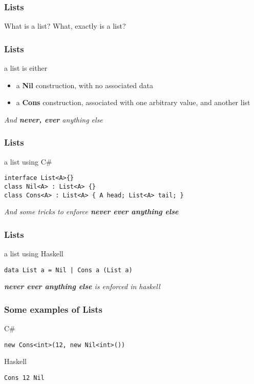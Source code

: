 \begin{frame}
\frametitle{Lists}
\begin{block}{What is a list?}
What, exactly is a list?
\end{block}
\end{frame}

\begin{frame}
\frametitle{Lists}
\begin{block}{a list is either}
\begin{itemize}
\item a \textbf{Nil} construction, with no associated data
\item a \textbf{Cons} construction, associated with one arbitrary value, and another list
\end{itemize}
\end{block}
\emph{And \textbf{never, ever} anything else}
\end{frame}

\begin{frame}[fragile]
\frametitle{Lists}
\begin{block}{a list using C\#}
\begin{lstlisting}[style=csharp,basicstyle=\scriptsize\ttfamily,mathescape]
interface List<A>{}
class Nil<A> : List<A> {}
class Cons<A> : List<A> { A head; List<A> tail; }
\end{lstlisting}
\end{block}
\tiny{\emph{And some tricks to enforce \textbf{never ever anything else}}}
\end{frame}

\begin{frame}[fragile]
\frametitle{Lists}
\begin{block}{a list using Haskell}
\begin{lstlisting}[style=haskell,basicstyle=\scriptsize\ttfamily,mathescape]
data List a = Nil | Cons a (List a)
\end{lstlisting}
\end{block}
\tiny{\emph{\textbf{never ever anything else} is enforced in haskell}}
\end{frame}

\begin{frame}[fragile]
\frametitle{Some examples of Lists}
\begin{block}{C\#}
\begin{lstlisting}[style=csharp,basicstyle=\scriptsize\ttfamily,mathescape]
new Cons<int>(12, new Nil<int>())
\end{lstlisting}
\end{block}
\begin{block}{Haskell}
\begin{lstlisting}[style=haskell,basicstyle=\scriptsize\ttfamily,mathescape]
Cons 12 Nil
\end{lstlisting}
\end{block}
\end{frame}

